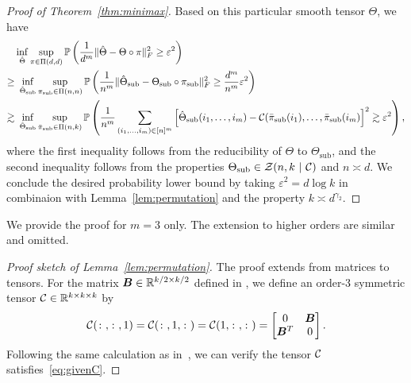 \documentclass[11pt]{article}
\theoremstyle{definition}
\begin{document}
\begin{proof}[Proof of Theorem~\ref{thm:minimax}]
Based on this particular smooth tensor $\Theta$, we have
\begin{align}\label{eq:lower}
&\inf_{\hat \Theta}\sup_{\pi\in \Pi(d,d)}\mathbb{P}\left({1\over d^m}\FnormSize{}{\hat \Theta-\Theta\circ \pi}^2\geq \varepsilon^2\right)\notag \\
\geq & \ \inf_{\hat  \Theta_{\text{sub}}}\sup_{\pi_{\text{sub}}\in\Pi(n,n)}\mathbb{P}\left({1\over n^m}\FnormSize{}{\hat \Theta_\text{sub}-\Theta_{\text{sub}}\circ \pi_{\text{sub}}}^2\geq {d^m\over n^m} \varepsilon^2\right)\notag \\
\gtrsim & \ \inf_{\hat  \Theta_{\text{sub}}}\sup_{\bar \pi_{\text{sub}}\in\Pi(n,k)}\mathbb{P}\left({1\over n^m}\sum_{(i_1,\ldots,i_m)\in[n]^m}\left[\hat \Theta_\text{sub}(i_1,\ldots,i_m)-\tC(\bar \pi_{\text{sub}}(i_1),\ldots,\bar \pi_{\text{sub}}(i_m)\right]^2\gtrsim \varepsilon^2\right),
\end{align}
where the first inequality follows from the reducibility of $\Theta$ to $\Theta_{\text{sub}}$, and the second inequality follows from the properties $\Theta_{\text{sub}}\in \mathcal{Z}(n,k\ |\ \mathcal{C})$ and $n\asymp d$. 
We conclude the desired probability lower bound by taking $\varepsilon^2={d\log k }$ in combinaion with Lemma~\ref{lem:permutation} and the property $k\asymp d^{\gamma_2}$.
\end{proof}

\appendix 
We provide the proof for $m=3$ only. The extension to higher orders are similar and omitted. 

\begin{proof}[Proof sketch of Lemma~\ref{lem:permutation}]
The proof extends \citet[Theorem 2.2, page 26]{gao2015rate} from matrices to tensors. 
For the matrix $\bm B\in\mathbb{R}^{k/2\times k/2}$ defined in \citet[Theorem 2.2, page]{gao2015rate}, we define an order-3 symmetric tensor $\mathcal{C}\in\mathbb{R}^{k\times k\times k}$ by
\[
\mathcal{C}(\colon,\colon,1)=\mathcal{C}(\colon,1,\colon)=\mathcal{C}(1,\colon,\colon)=
\begin{bmatrix}
0&\bm B\\
\bm B^T&0
\end{bmatrix}.
\]
Following the same calculation as in~\cite{gao2015rate}, we can verify the tensor $\mathcal{C}$ satisfies~\eqref{eq:givenC}.
\end{proof}
\end{document}
